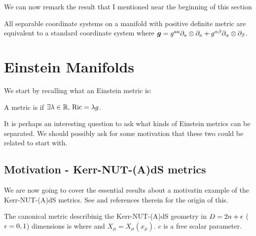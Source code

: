 \documentclass{article}
\begin{document}
We can now remark the result that I mentioned near the beginning of this section 

\begin{theorem}
All separable coordinate systems on a manifold with positive definite metric are equivalent to a standard coordinate system where $\bm{g} = g^{aa} \partial_a \otimes \partial_a + g^{\alpha\beta} \partial_\alpha \otimes \partial_\beta$. 
\end{theorem}

\section{Einstein Manifolds}

We start by recalling what an Einstein metric is:

\begin{definition}
A metric is  if $\exists \lambda \in \mathbb{R}, \, \operatorname{Ric} = \lambda g$. 
\end{definition}

It is perhaps an interesting question to ask what kinds of Einstein metrics can be separated. We should possibly ask for some motivation that these two could be related to start with. 

\subsection{Motivation - Kerr-NUT-(A)dS metrics}
We are now going to cover the essential results about a motivatin example of the Kerr-NUT-(A)dS metrics. See \cite{Frolov2017} and references therein for the origin of this.

\begin{definition}
	The canonical metric describinig the Kerr-NUT-(A)dS geometry in $D=2n+\epsilon$ ($\epsilon=0,1$) dimensions is 
where 
and $X_\mu = X_\mu(x_\mu)$. $c$ is a free scalar parameter. 
\end{definition}
\end{document}
